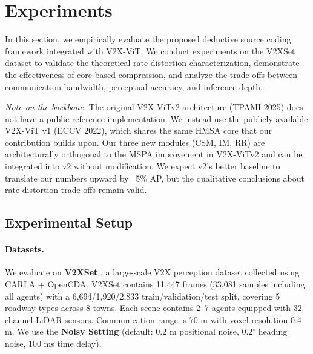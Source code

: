 
\section{Experiments}
\label{sec:exp}

In this section, we empirically evaluate the proposed deductive source coding framework
integrated with V2X-ViT. We conduct experiments on the V2XSet dataset to validate
the theoretical rate-distortion characterization, demonstrate the effectiveness of
core-based compression, and analyze the trade-offs between communication bandwidth,
perceptual accuracy, and inference depth.

\textit{Note on the backbone.} The original V2X-ViTv2 architecture (TPAMI 2025) does not
have a public reference implementation. We instead use the publicly available V2X-ViT v1
(ECCV 2022), which shares the same HMSA core that our contribution builds upon. Our
three new modules (CSM, IM, RR) are architecturally orthogonal to the MSPA
improvement in V2X-ViTv2 and can be integrated into v2 without modification. We
expect v2's better baseline to translate our numbers upward by ~5\% AP, but the
qualitative conclusions about rate-distortion trade-offs remain valid.

\subsection{Experimental Setup}
\label{sec:exp-setup}

\paragraph{Datasets.}
We evaluate on \textbf{V2XSet} \cite{xu2024v2x}, a large-scale V2X perception
dataset collected using CARLA + OpenCDA. V2XSet contains 11,447 frames
(33,081 samples including all agents) with a 6,694/1,920/2,833
train/validation/test split, covering 5 roadway types across 8 towns. Each
scene contains 2--7 agents equipped with 32-channel LiDAR sensors.
Communication range is 70 m with voxel resolution 0.4 m. We use the
\textbf{Noisy Setting} (default: 0.2 m positional noise, 0.2$^\circ$ heading
noise, 100 ms time delay).

